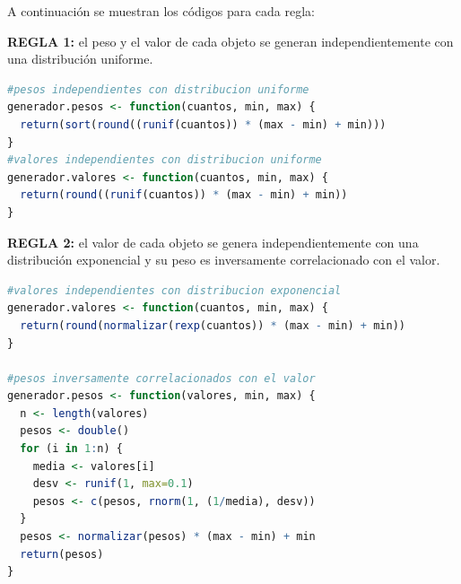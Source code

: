 \documentclass{article}
\begin{document}
A continuación se muestran los códigos para cada regla:
\bigskip

\textbf{REGLA 1:} el peso y el valor de cada objeto se generan independientemente con una distribución uniforme.



\lstset{style=mystyle}
\begin{lstlisting}[language=R, caption= Código para cumplir la regla 1.]
#pesos independientes con distribucion uniforme
generador.pesos <- function(cuantos, min, max) {
  return(sort(round((runif(cuantos)) * (max - min) + min)))
}
#valores independientes con distribucion uniforme
generador.valores <- function(cuantos, min, max) {
  return(round((runif(cuantos)) * (max - min) + min))
}
\end{lstlisting}

\textbf{REGLA 2:} el valor de cada objeto se genera independientemente con una distribución exponencial y su peso es inversamente correlacionado con el valor.

\lstset{style=mystyle}
\begin{lstlisting}[language=R, caption= Código para cumplir la regla 2.]
#valores independientes con distribucion exponencial
generador.valores <- function(cuantos, min, max) {
  return(round(normalizar(rexp(cuantos)) * (max - min) + min))
}

#pesos inversamente correlacionados con el valor
generador.pesos <- function(valores, min, max) {
  n <- length(valores)
  pesos <- double()
  for (i in 1:n) {
    media <- valores[i]
    desv <- runif(1, max=0.1)
    pesos <- c(pesos, rnorm(1, (1/media), desv))
  }
  pesos <- normalizar(pesos) * (max - min) + min
  return(pesos)
}
\end{lstlisting}
\end{document}
